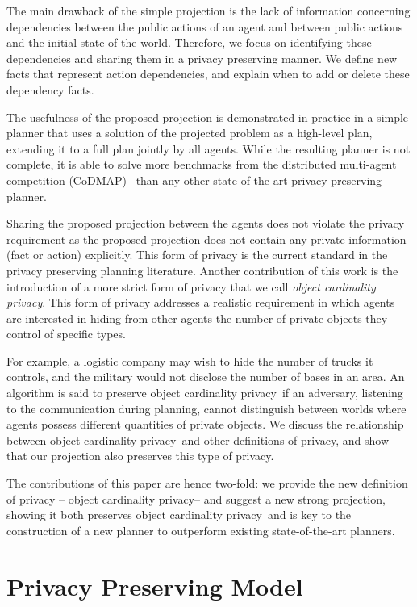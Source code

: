 \documentclass[letterpaper]{article}
\newcommand\cprivacy{object cardinality privacy}
\theoremstyle{definition}
\begin{document}
The main drawback of the simple projection is the lack of information concerning dependencies between the public actions of an agent and between public actions and the initial state of the world. 
Therefore, we focus on identifying these dependencies and sharing them in a privacy preserving manner. We define new facts that represent action dependencies, and explain when to add or delete these dependency facts. 


The usefulness of the proposed projection is demonstrated in practice in a simple planner that uses a solution of the projected problem as a high-level plan, extending it to a full plan jointly by all agents. While the resulting planner is not complete, it is able to solve more benchmarks from the distributed multi-agent competition (CoDMAP)~\cite{vstolba2015competition} than any other state-of-the-art privacy preserving planner. 

Sharing the proposed projection between the agents does not violate the privacy requirement as the proposed projection does not contain any private information (fact or action) explicitly. This form of privacy is the current standard in the privacy preserving planning literature. 
Another contribution of this work is the introduction of a more strict form of privacy that we call {\em \cprivacy }. This form of privacy addresses a realistic requirement in which agents are interested in hiding from other agents the number of private objects they control of specific types. 

For example, a logistic company may wish to hide the number of trucks it controls, and the military would not disclose the number of bases in an area. An algorithm is said to preserve \cprivacy\ if an adversary, listening to the communication during planning, cannot distinguish between worlds where agents possess different quantities of private objects. We discuss the relationship between \cprivacy\ and other definitions of privacy, and show that our projection also preserves this type of privacy. %

The contributions of this paper are hence two-fold: we provide the new definition of privacy -- \cprivacy -- and suggest a new strong projection, showing it both preserves \cprivacy\ and is key to the construction of a new planner to outperform existing state-of-the-art planners.

\section{Privacy Preserving Model}
\end{document}
